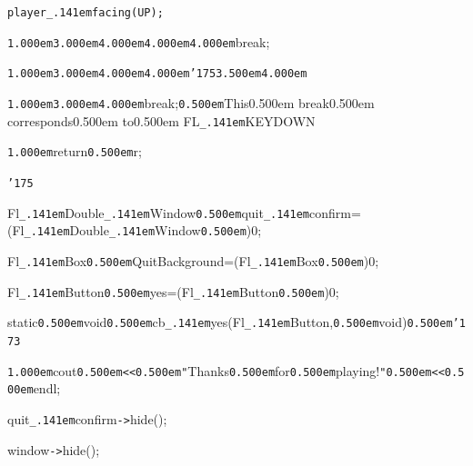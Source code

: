 \documentclass[12pt]{article}
\begin{document}
\noindent
\tt\mc {\tt\mc \kern1.000em}{\tt\mc \kern3.000em}{\tt\mc \kern4.000em}{\tt\mc \kern4.000em}{\tt\mc \kern4.000em}player{\tt\_\kern.141em}facing(UP);

\noindent
{}{\tt\mc \kern1.000em}{\tt\mc \kern3.000em}{\tt\mc \kern4.000em}{\tt\mc \kern4.000em}{\tt\mc \kern4.000em}break;

\noindent
{}{\tt\mc \kern1.000em}{\tt\mc \kern3.000em}{\tt\mc \kern4.000em}{\tt\mc \kern4.000em}{\tt\char'175}{\tt\mc \kern3.500em}{\tt\mc \kern4.000em}

\noindent
{}{\tt\mc \kern1.000em}{\tt\mc \kern3.000em}{\tt\mc \kern4.000em}break;{\tt\mc \kern0.500em}\rm\mc {\tt /}{\tt /}This\kern0.500em break\kern0.500em corresponds\kern0.500em to\kern0.500em FL{\tt\_\kern.141em}KEYDOWN

\noindent
\tt{}

\noindent
{}{\tt\mc \kern1.000em}return{\tt\mc \kern0.500em}r;

\noindent
{}{\tt\char'175}

\noindent
{}\hfill

\noindent
{}Fl{\tt\_\kern.141em}Double{\tt\_\kern.141em}Window{\tt\mc \kern0.500em}{\tt *}quit{\tt\_\kern.141em}confirm=(Fl{\tt\_\kern.141em}Double{\tt\_\kern.141em}Window{\tt\mc \kern0.500em}{\tt *})0;

\noindent
{}\hfill

\noindent
{}Fl{\tt\_\kern.141em}Box{\tt\mc \kern0.500em}{\tt *}QuitBackground=(Fl{\tt\_\kern.141em}Box{\tt\mc \kern0.500em}{\tt *})0;

\noindent
{}\hfill

\noindent
{}Fl{\tt\_\kern.141em}Button{\tt\mc \kern0.500em}{\tt *}yes=(Fl{\tt\_\kern.141em}Button{\tt\mc \kern0.500em}{\tt *})0;

\noindent
{}\hfill

\noindent
{}static{\tt\mc \kern0.500em}void{\tt\mc \kern0.500em}cb{\tt\_\kern.141em}yes(Fl{\tt\_\kern.141em}Button{\tt *},{\tt\mc \kern0.500em}void{\tt *}){\tt\mc \kern0.500em}{\tt\char'173}

\noindent
{}{\tt\mc \kern1.000em}cout{\tt\mc \kern0.500em}{\tt <}{\tt <}{\tt\mc \kern0.500em}{\tt "}Thanks{\tt\mc \kern0.500em}for{\tt\mc \kern0.500em}playing!{\tt "}{\tt\mc \kern0.500em}{\tt <}{\tt <}{\tt\mc \kern0.500em}endl;

\noindent
{}quit{\tt\_\kern.141em}confirm{\tt -}{\tt >}hide();

\noindent
{}window{\tt -}{\tt >}hide();
\end{document}
